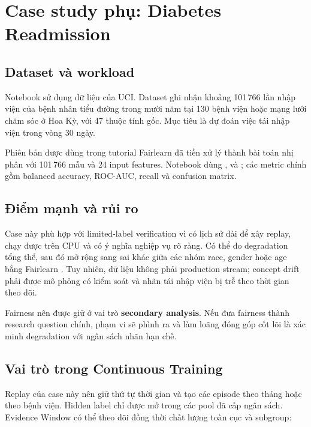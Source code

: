 \section{Case study phụ: Diabetes Readmission}

\subsection{Dataset và workload}

Notebook  sử dụng dữ liệu  của UCI. Dataset ghi nhận khoảng 101\,766 lần nhập viện của bệnh nhân tiểu đường trong mười năm tại 130 bệnh viện hoặc mạng lưới chăm sóc ở Hoa Kỳ, với 47 thuộc tính gốc. Mục tiêu là dự đoán việc tái nhập viện trong vòng 30 ngày.

Phiên bản được dùng trong tutorial Fairlearn đã tiền xử lý thành bài toán nhị phân với 101\,766 mẫu và 24 input features. Notebook dùng ,  và ; các metric chính gồm balanced accuracy, ROC-AUC, recall và confusion matrix.

\subsection{Điểm mạnh và rủi ro}

Case này phù hợp với limited-label verification vì có lịch sử dài để xây replay, chạy được trên CPU và có ý nghĩa nghiệp vụ rõ ràng. Có thể đo degradation tổng thể, sau đó mở rộng sang sai khác giữa các nhóm race, gender hoặc age bằng Fairlearn . Tuy nhiên, dữ liệu không phải production stream; concept drift phải được mô phỏng có kiểm soát và nhãn tái nhập viện bị trễ theo thời gian theo dõi.

Fairness nên được giữ ở vai trò \textbf{secondary analysis}. Nếu đưa fairness thành research question chính, phạm vi sẽ phình ra và làm loãng đóng góp cốt lõi là xác minh degradation với ngân sách nhãn hạn chế.

\subsection{Vai trò trong Continuous Training}

Replay của case này nên giữ thứ tự thời gian và tạo các episode theo tháng hoặc theo bệnh viện. Hidden label chỉ được mở trong các pool đã cấp ngân sách. Evidence Window có thể theo dõi đồng thời chất lượng toàn cục và subgroup:

